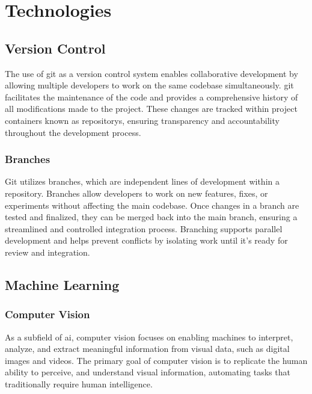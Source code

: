 \section{Technologies}
\label{sec:technologies}

\subsection{Version Control}
\label{subsec:version-control}

The use of \gls{git} as a version control system enables collaborative development by allowing multiple developers to work on the same codebase simultaneously. \gls{git} facilitates the maintenance of the code and provides a comprehensive history of all modifications made to the project. These changes are tracked within project containers known as \glspl{repository}, ensuring transparency and accountability throughout the development process. \cite{alphaefficiency:git}

\subsubsection*{Branches}

Git utilizes branches, which are independent lines of development within a repository. Branches allow developers to work on new features, fixes, or experiments without affecting the main codebase. Once changes in a branch are tested and finalized, they can be merged back into the main branch, ensuring a streamlined and controlled integration process. Branching supports parallel development and helps prevent conflicts by isolating work until it's ready for review and integration. \cite{git:branches}

\subsection{Machine Learning}
\label{sec:machine-learning}

\subsubsection*{Computer Vision}
\label{subsubsec:computer-vision}

As a subfield of \gls{ai}, computer vision focuses on enabling machines to interpret, analyze, and extract meaningful information from visual data, such as digital images and videos. The primary goal of computer vision is to replicate the human ability to perceive, and understand visual information, automating tasks that traditionally require human intelligence.

